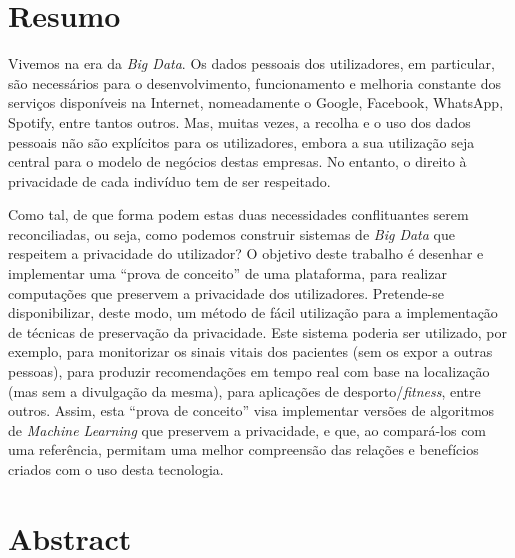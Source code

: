 %

\chapter*{Resumo} %
\thispagestyle{empty}

Vivemos na era da \textit{Big Data}. Os dados pessoais dos utilizadores, em particular, s\~{a}o necess\'{a}rios para o desenvolvimento, funcionamento e melhoria constante dos servi\c{c}os dispon\'{i}veis na Internet, nomeadamente o Google, Facebook, WhatsApp, Spotify, entre tantos outros. Mas, muitas vezes, a recolha e o uso dos dados pessoais n\~{a}o s\~{a}o expl\'{i}citos para os utilizadores, embora a sua utiliza\c{c}\~{a}o seja central para o modelo de neg\'{o}cios destas empresas. No entanto, o direito \`{a} privacidade de cada indiv\'{i}duo tem de ser respeitado.

Como tal, de que forma podem estas duas necessidades conflituantes serem reconciliadas, ou seja, como podemos construir sistemas de \textit{Big Data} que respeitem a privacidade do utilizador? O objetivo deste trabalho \'{e} desenhar e implementar uma ``prova de conceito'' de uma plataforma, para realizar computa\c{c}ões que preservem a privacidade dos utilizadores. Pretende-se disponibilizar, deste modo, um m\'{e}todo de f\'{a}cil utiliza\c{c}\~{a}o para a implementa\c{c}\~{a}o de t\'{e}cnicas de preserva\c{c}\~{a}o da privacidade. Este sistema poderia ser utilizado, por exemplo, para monitorizar os sinais vitais dos pacientes (sem os expor a outras pessoas), para produzir recomenda\c{c}ões em tempo real com base na localiza\c{c}\~{a}o (mas sem a divulga\c{c}\~{a}o da mesma), para aplica\c{c}ões de desporto/\textit{fitness}, entre outros. Assim, esta ``prova de conceito'' visa implementar versões de algoritmos de \textit{Machine Learning} que preservem a privacidade, e que, ao compar\'{a}-los com uma refer\^{e}ncia, permitam uma melhor compreens\~{a}o das rela\c{c}ões e benef\'{i}cios criados com o uso desta tecnologia.


\newpage

\chapter*{Abstract} %
\thispagestyle{empty}

